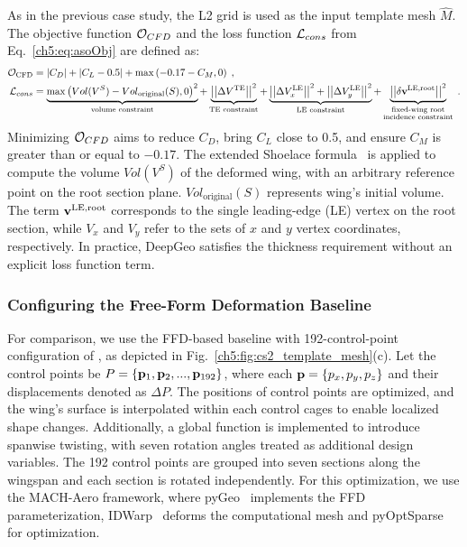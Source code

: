 As in the previous case study, the L2 grid is used as the input template mesh $\hat{M}$.
The objective function $\mathcal{O}_{CFD}$ and the loss function $\mathcal{L}_{cons}$ from Eq.~\ref{ch5:eq:asoObj} are defined as:
%
\begin{align}
    \mathcal{O}_\text{CFD} & = \left| C_D \right| + \left| C_L-0.5 \right| + \max \left( -0.17 - C_M, 0 \right) \;, \label{ch5:eq:cfdWing}  \\
    \mathcal{L}_{cons} & = 
    \underbrace{{\max \left(Vol(V^S)-{Vol}_\text{original}(S), 0\right)} ^2}_\text{volume constraint} + 
    \underbrace{\left|\left|\Delta V^\text{TE}\right|\right|^2}_\text{TE constraint} +
    \underbrace{\left|\left|\Delta V^\text{LE}_x\right|\right|^2 + \left|\left|\Delta V^\text{LE}_y\right|\right|^2}_\text{LE constraint} +
    \underbrace{\left|\left|\delta \mathbf{v}^\text{LE,root}\right|\right|^2}_{ \substack{\text{fixed-wing root}\\ \text{incidence constraint}} } \; . \nonumber
\end{align}
%
Minimizing $\mathcal{O}_{CFD}$ aims to reduce $C_D$, bring $C_L$ close to 0.5, and ensure $C_M$ is greater than or equal to $-0.17$.  The extended Shoelace formula~\cite{aa.Zhang2001} is applied to compute the volume $Vol(V^S)$ of the deformed wing, with an arbitrary reference point on the root section plane. ${Vol}_\text{original}(S)$ represents wing's initial volume. The term $\mathbf{v}^\text{LE,root}$ corresponds to the single leading-edge (LE) vertex on the root section, while $V_x$ and $V_y$ refer to the sets of $x$ and $y$ vertex coordinates, respectively. In practice, DeepGeo satisfies the thickness requirement without an explicit loss function term.

\subsubsection{Configuring the Free-Form Deformation Baseline}

For comparison, we use the FFD-based baseline with 192-control-point configuration of \citet{aa.Hwang2019,aa.Li2019}, as depicted in Fig.~\ref{ch5:fig:cs2_template_mesh}(c). Let the control points be $P=\{\mathbf{p}_1, \mathbf{p}_2,..., \mathbf{p}_{192}\}$, where each $\mathbf{p}=\{p_x, p_y, p_z\}$ and their displacements denoted as $\Delta P$. The positions of control points are optimized, and the wing's surface is interpolated within each control cages to enable localized shape changes. Additionally, a global function is implemented to introduce spanwise twisting, with seven rotation angles treated as additional design variables.
The 192 control points are grouped into seven sections along the wingspan and each section is rotated independently.
For this optimization, we use the MACH-Aero framework, where pyGeo~\cite{aa.Kenway2010} implements the FFD parameterization, IDWarp~\cite{aa.Secco2021} deforms the computational mesh and pyOptSparse~\cite{aa.Wu2020} for optimization.

